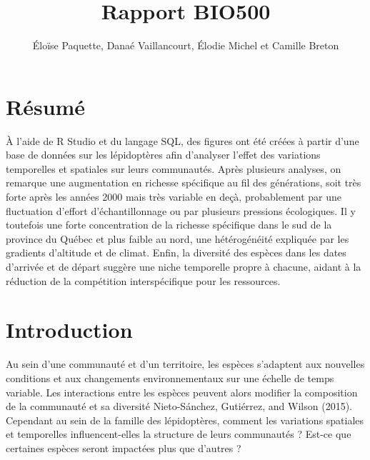 \documentclass[9pt,twocolumn,twoside,]{pnas-new}
\title{Rapport BIO500}
\author[]{Éloïse Paquette, Danaé Vaillancourt, Élodie Michel et Camille
Breton}
\begin{document}
\verticaladjustment{-2pt}



\maketitle
\thispagestyle{firststyle}


\acknow{}

\section*{Résumé}\label{ruxe9sumuxe9}

À l'aide de R Studio et du langage SQL, des figures ont été créées à
partir d'une base de données sur les lépidoptères afin d'analyser
l'effet des variations temporelles et spatiales sur leurs communautés.
Après plusieurs analyses, on remarque une augmentation en richesse
spécifique au fil des générations, soit très forte après les années 2000
mais très variable en deçà, probablement par une fluctuation d'effort
d'échantillonnage ou par plusieurs pressions écologiques. Il y toutefois
une forte concentration de la richesse spécifique dans le sud de la
province du Québec et plus faible au nord, une hétérogénéité expliquée
par les gradients d'altitude et de climat. Enfin, la diversité des
espèces dans les dates d'arrivée et de départ suggère une niche
temporelle propre à chacune, aidant à la réduction de la compétition
interspécifique pour les ressources.

\section*{Introduction}\label{introduction}

Au sein d'une communauté et d'un territoire, les espèces s'adaptent aux
nouvelles conditions et aux changements environnementaux sur une échelle
de temps variable. Les interactions entre les espèces peuvent alors
modifier la composition de la communauté et sa diversité Nieto-Sánchez,
Gutiérrez, and Wilson (2015). Cependant au sein de la famille des
lépidoptères, comment les variations spatiales et temporelles
influencent-elles la structure de leurs communautés ? Est-ce que
certaines espèces seront impactées plus que d'autres ?
\end{document}
